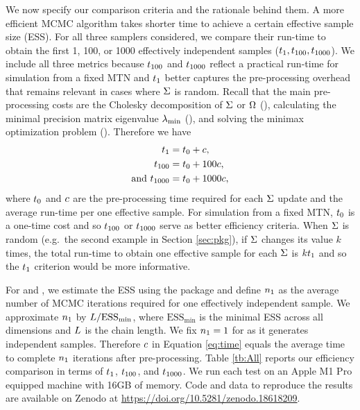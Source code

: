 We now specify our comparison criteria and the rationale behind them.
A more efficient MCMC algorithm takes shorter time to achieve a certain effective sample size (ESS).
For all three samplers considered, we compare their run-time to obtain the first 1, 100, or 1000 effectively independent samples ($t_{1}, t_{100}, t_{1000} $).
We include all three metrics because $t_{100} $ and $t_{1000} $ reflect a practical run-time for simulation from a fixed MTN and $ t_{1} $ better captures the pre-processing overhead that remains relevant in cases where $\Sigma$ is random. 
Recall that the main pre-processing costs are the Cholesky decomposition of $ \Sigma $ or $ \Omega $ (\hhmc), calculating the minimal precision matrix eigenvalue $ \lambda_{\text{min}} $ (\zhmc), and solving the minimax optimization problem (\mt).
Therefore we have 
\begin{equation}\label{eq:time}
\begin{split}
t_{1} & = t_{0} + c, \\
t_{100} & =  t_{0} + 100c, \\
\text{and } t_{1000} & =  t_{0} + 1000c, 
\end{split}
\end{equation}
where $ t_{0} $ and $ c $ are the pre-processing time required for each $ \Sigma $ update and the average run-time per one effective sample.
For simulation from a fixed MTN, $ t_{0} $ is a one-time cost and so $ t_{100} $ or $t_{1000}$ serve as better efficiency criteria.
When $ \Sigma $ is random (e.g.\ the second example in Section \ref{sec:pkg}), if $ \Sigma $ changes its value $ k $ times, the total run-time to obtain one effective sample for each $ \Sigma $ is $ k t_{1} $ and so the $ t_{1} $ criterion would be more informative.

For \hhmc and \zhmc, we estimate the ESS using the  package \citep{codapkg} and define $ n_1 $ as the average number of MCMC iterations required for one effectively independent sample.
We approximate $ n_1 $ by $ L / \text{ESS}_{\text{min}}$, where $\text{ESS}_{\text{min}}$ is the minimal ESS across all dimensions and $L $ is the chain length. 
We fix $ n_1 = 1$ for \mt as it generates independent samples.
Therefore $ c $ in Equation \eqref{eq:time} equals the average time to complete $ n_1 $ iterations after pre-processing.
Table \ref{tb:All} reports our efficiency comparison in terms of $t_{1}$, $t_{100} $, and $ t_{1000} $.
We run each test on an Apple M1 Pro equipped machine with 16GB of memory. Code and data to reproduce the results are available on Zenodo at \url{https://doi.org/10.5281/zenodo.18618209}.

